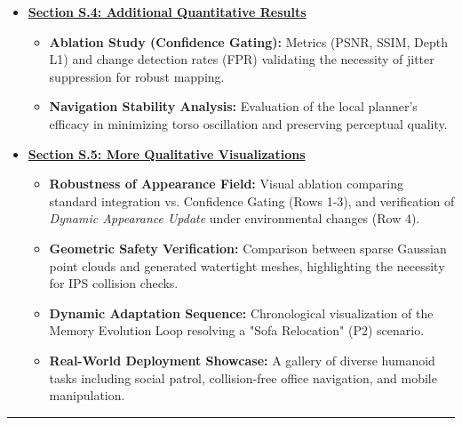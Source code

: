 \documentclass[conference]{IEEEtran}
\begin{document}
\begin{strip}
\begin{center}
\begin{minipage}{0.96\textwidth}
\begin{itemize}
    \item \textbf{\hyperref[sec:add_experiments]{Section S.4: Additional Quantitative Results}}
    \begin{itemize} \setlength{\itemsep}{1pt} \setlength{\topsep}{0pt} \small
        \item \textbf{Ablation Study (Confidence Gating):} Metrics (PSNR, SSIM, Depth L1) and change detection rates (FPR) validating the necessity of jitter suppression for robust mapping.
        \item \textbf{Navigation Stability Analysis:} Evaluation of the local planner's efficacy in minimizing torso oscillation and preserving perceptual quality.
    \end{itemize}

    \item \textbf{\hyperref[sec:qualitative_results]{Section S.5: More Qualitative Visualizations}}
    \begin{itemize} \setlength{\itemsep}{1pt} \setlength{\topsep}{0pt} \small
        \item \textbf{Robustness of Appearance Field:} Visual ablation comparing standard integration vs. Confidence Gating (Rows 1-3), and verification of \textit{Dynamic Appearance Update} under environmental changes (Row 4).
        \item \textbf{Geometric Safety Verification:} Comparison between sparse Gaussian point clouds and generated watertight meshes, highlighting the necessity for IPS collision checks.
        \item \textbf{Dynamic Adaptation Sequence:} Chronological visualization of the Memory Evolution Loop resolving a "Sofa Relocation" (P2) scenario.
        \item \textbf{Real-World Deployment Showcase:} A gallery of diverse humanoid tasks including social patrol, collision-free office navigation, and mobile manipulation.
    \end{itemize}
\end{itemize}
\end{minipage}

\vspace{0.3cm}
\hrule
\vspace{0.8cm}

\end{center}
\end{strip}


\setcounter{section}{0}
\setcounter{equation}{0}
\setcounter{figure}{0}
\setcounter{table}{0}
\setcounter{page}{1}
\makeatletter
\end{document}
